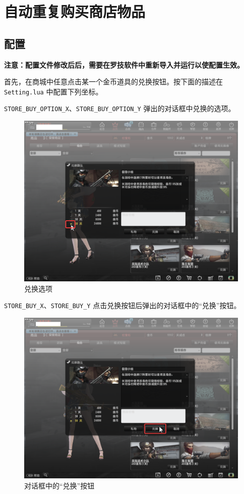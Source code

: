 \section{自动重复购买商店物品}

\subsection{配置}

\textbf{\color{red}注意：配置文件修改后后，需要在罗技软件中重新导入并运行以使配置生效。}

首先，在商城中任意点击某一个金币道具的兑换按钮。按下面的描述在 \lstinline{Setting.lua} 中配置下列坐标。

\lstinline{STORE_BUY_OPTION_X}、\lstinline{STORE_BUY_OPTION_Y} 弹出的对话框中兑换的选项。

\begin{figure}[H]
    \Centering
    \includegraphics[width=\textwidth]{docs/assets/store_buy_option.png}
    \caption{兑换选项}
\end{figure}

\lstinline{STORE_BUY_X}、\lstinline{STORE_BUY_Y} 点击兑换按钮后弹出的对话框中的“兑换”按钮。

\begin{figure}[H]
    \Centering
    \includegraphics[width=\textwidth]{docs/assets/store_purchase.png}
    \caption{对话框中的“兑换”按钮}
\end{figure}

